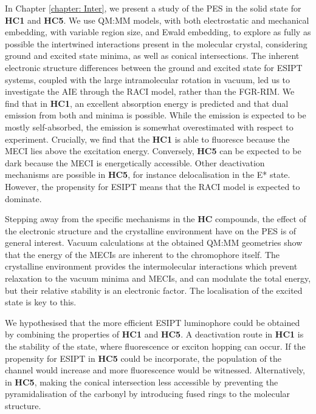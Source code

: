 In Chapter \ref{chapter: Inter}, we present a study of the \ac{PES} in the solid state for \textbf{HC1} and \textbf{HC5}. We use QM:MM models, with both electrostatic and mechanical embedding, with variable region size, and Ewald embedding, to explore as fully as possible the intertwined interactions present in the molecular crystal, considering ground and excited state minima, as well as conical intersections. The inherent electronic structure differences between the ground and excited state for ESIPT systems, coupled with the large intramolecular rotation in vacuum, led us to investigate the \ac{AIE} through the RACI model, rather than the \ac{FGR-RIM}. We find that in \textbf{HC1}, an excellent absorption energy is predicted and that dual emission from both \Estar{} and \Kstar{} minima is possible. While the \Estar{} emission is expected to be mostly self-absorbed, the \Kstar{} emission is somewhat overestimated with respect to experiment.%
Crucially, we find that the \textbf{HC1} is able to fluoresce because the \ac{MECI} lies above the excitation energy. Conversely, \textbf{HC5} can be expected to be dark because the \ac{MECI} is energetically accessible. Other deactivation mechanisms are possible in \textbf{HC5}, for instance delocalisation in the E* state. However, the propensity for ESIPT means that the RACI model is expected to dominate. 

Stepping away from the specific mechanisms in the \textbf{HC} compounds, the effect of the electronic structure and the crystalline environment have on the \ac{PES} is of general interest. Vacuum calculations at the obtained QM:MM geometries show that the energy of the MECIs are inherent to the chromophore itself. The crystalline environment provides the intermolecular interactions which prevent relaxation to the vacuum minima and \acp{MECI}, and can modulate the total energy, but their relative stability is an electronic factor. The localisation of the excited state is key to this.

We hypothesised that the more efficient ESIPT luminophore could be obtained by combining the properties of \textbf{HC1} and \textbf{HC5}. A deactivation route in \textbf{HC1} is the stability of the \Estar{} state, where fluorescence or exciton hopping can occur. If the propensity for ESIPT in \textbf{HC5} could be incorporate, the population of the \Kstar{} channel would increase and more fluorescence would be witnessed. Alternatively, in \textbf{HC5}, making the conical intersection less accessible by preventing the pyramidalisation of the carbonyl by introducing fused rings to the molecular structure.

